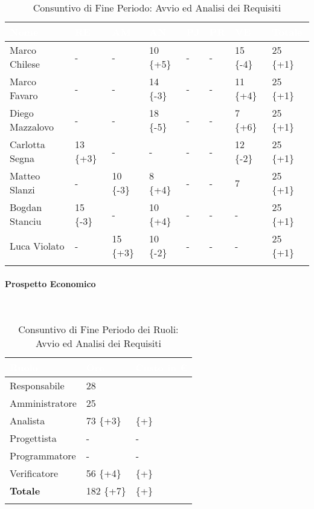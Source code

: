 \begin{longtable}{|C{.30\textwidth}|C{.06\textwidth}|C{.06\textwidth}|C{.06\textwidth} | C{.06\textwidth}| C{.06\textwidth} | C{.06\textwidth} | C{.10\textwidth} |}
\hline
{}	\textbf{\textcolor{white}{Nome}} & \textbf{\textcolor{white}{RE}} & \textbf{\textcolor{white}{AM}} & \textbf{\textcolor{white}{AN}} & \textbf{\textcolor{white}{PJ}} & \textbf{\textcolor{white}{PR}} & \textbf{\textcolor{white}{VE}} & \textbf{\textcolor{white}{Totale}}\\
\hline 
Marco Chilese & - & - & 10 \{+5\} & - & - & 15 \{-4\} & 25 \{+1\} \\
\hline
{}Marco Favaro & - & - & 14 \{-3\} & - & - & 11 \{+4\} & 25 \{+1\} \\
\hline
Diego Mazzalovo & - & - & 18 \{-5\} & - & - & 7 \{+6\} & 25 \{+1\} \\
\hline
{}Carlotta Segna & 13 \{+3\} & - & - & - & - & 12 \{-2\} & 25 \{+1\} \\
\hline
Matteo Slanzi & - & 10 \{-3\} & 8 \{+4\} & - & - & 7 & 25 \{+1\} \\
\hline
{}Bogdan Stanciu & 15 \{-3\} & - & 10 \{+4\} & - & - & - & 25 \{+1\}\\
\hline
Luca Violato & - & 15 \{+3\} & 10 \{-2\} & - & - & - & 25 \{+1\} \\
\hline


\caption{Consuntivo di Fine Periodo: Avvio ed Analisi dei Requisiti}
\label{tab:cfp_aar}
\end{longtable}

\paragraph{Prospetto Economico} \-\\

\begin{longtable}{| C{.30\textwidth}| C{.15\textwidth}| C{.20\textwidth}|}
\hline
{}\textbf{\textcolor{white}{Ruolo}} & \textbf{\textcolor{white}{Ore}} & \textbf{\textcolor{white}{Costo in \euro}} \\
\hline
Responsabile & 28 &  \\
\hline
{}Amministratore & 25 &  \\
\hline
Analista & 73 \{+3\} &  \{+\}\\
\hline
{}Progettista & - & - \\
\hline
Programmatore & - & - \\
\hline
{}Verificatore & 56 \{+4\} &  \{+\}\\
\hline
\textbf{Totale} & 182 \{+7\}&  \{+\}\\
\hline
\caption{Consuntivo di Fine Periodo dei Ruoli: Avvio ed Analisi dei Requisiti}
\label{tab:doaar}
\end{longtable}

